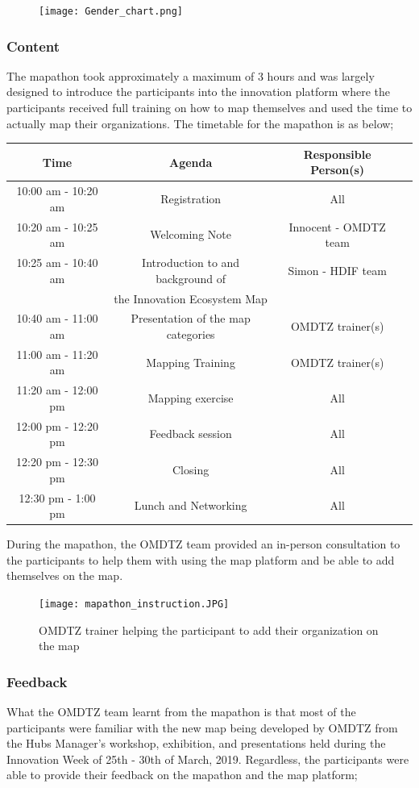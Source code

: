 \documentclass[a4paper,12pt,twoside]{article}
\begin{document}
\begin{figure}[h]
	\centering
	\texttt{[image: Gender\_chart.png]}
\end{figure}

\subsubsection{Content}
The mapathon took approximately a maximum of 3 hours and was largely designed to introduce the participants into the innovation platform where the participants received full training on how to map themselves and used the time to actually map their organizations. The timetable for the mapathon is as below;

\begin{tabular}{|c|c|c|c|}
	\hline
	\rowcolor{Gray}
	\bfseries Time & Agenda & Responsible Person(s)\\
	\hline
	10:00 am - 10:20 am & Registration & All\\
	\hline
	10:20 am - 10:25 am & Welcoming Note & Innocent - OMDTZ team\\
	\hline
	10:25 am - 10:40 am & Introduction to and background of & Simon - HDIF team\\
	{} &  the Innovation Ecosystem Map & {}\\
	\hline
	10:40 am - 11:00 am	& Presentation of the map categories & OMDTZ trainer(s)\\
	\hline
	11:00 am - 11:20 am & Mapping Training & OMDTZ trainer(s)\\
	\hline
	11:20 am - 12:00 pm & Mapping exercise & All\\
	\hline
	12:00 pm - 12:20 pm & Feedback session & All\\
	\hline
	12:20 pm - 12:30 pm & Closing & All\\
	\hline
	12:30 pm - 1:00 pm & Lunch and Networking & All\\
	\hline
\end{tabular}

During the mapathon, the OMDTZ team provided an in-person consultation to the participants to help them with using the map platform and be able to add themselves on the map.
\begin{figure}
	\centering
	\texttt{[image: mapathon\_instruction.JPG]}
	\caption{OMDTZ trainer helping the participant to add their organization on the map}
\end{figure}

\subsubsection{Feedback}
What the OMDTZ team learnt from the mapathon is that most of the participants were familiar with the new map being developed by OMDTZ from the Hubs Manager’s workshop, exhibition, and presentations held during the Innovation Week of 25th - 30th of March, 2019. Regardless, the participants were able to provide their feedback on the mapathon and the map platform;
\end{document}
